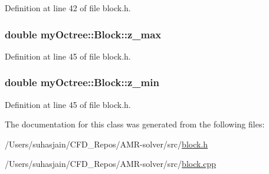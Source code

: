 Definition at line 42 of file block.\+h.

\hypertarget{classmy_octree_1_1_block_ac3a69cabd6ecedfcea7ccc5b52f32a1d}{}
\subsubsection[{z\+\_\+max}]{\setlength{\rightskip}{0pt plus 5cm}double my\+Octree\+::\+Block\+::z\+\_\+max}\label{classmy_octree_1_1_block_ac3a69cabd6ecedfcea7ccc5b52f32a1d}


Definition at line 45 of file block.\+h.

\hypertarget{classmy_octree_1_1_block_a8fe6cf2861bc5b7c3235cafcb4e33f35}{}
\subsubsection[{z\+\_\+min}]{\setlength{\rightskip}{0pt plus 5cm}double my\+Octree\+::\+Block\+::z\+\_\+min}\label{classmy_octree_1_1_block_a8fe6cf2861bc5b7c3235cafcb4e33f35}


Definition at line 45 of file block.\+h.



The documentation for this class was generated from the following files\+:\begin{DoxyCompactItemize}
\item 
/\+Users/suhasjain/\+C\+F\+D\+\_\+\+Repos/\+A\+M\+R-\/solver/src/\hyperlink{block_8h}{block.\+h}\item 
/\+Users/suhasjain/\+C\+F\+D\+\_\+\+Repos/\+A\+M\+R-\/solver/src/\hyperlink{block_8cpp}{block.\+cpp}\end{DoxyCompactItemize}
